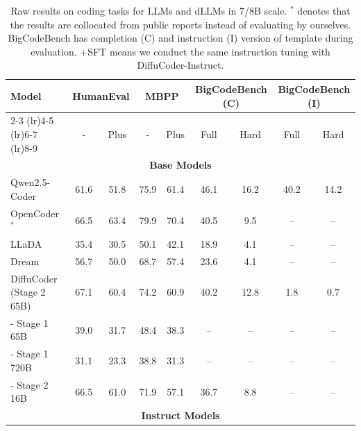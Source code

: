 \begin{table}[t]
    \centering
    \small
    \setlength{\tabcolsep}{8pt} 
    \caption{Raw results on coding tasks for LLMs and dLLMs in 7/8B scale. $^*$ denotes that the results are collocated from public reports instead of evaluating by ourselves. BigCodeBench has completion (C) and instruction (I) version of template during evaluation. +SFT means we conduct the same instruction tuning with DiffuCoder-Instruct.}
    \begin{tabular}{@{} l cc cc cc cc @{}}
        \toprule
        \multirow{2}{*}{\textbf{Model}}
            & \multicolumn{2}{c}{HumanEval}
            & \multicolumn{2}{c}{MBPP}
            & \multicolumn{2}{c}{BigCodeBench (C)} 
            & \multicolumn{2}{c}{BigCodeBench (I)} \\
        \cmidrule(lr){2-3} \cmidrule(lr){4-5} \cmidrule(lr){6-7} \cmidrule(lr){8-9}
            & -   & Plus
            & -   & Plus
            & \multicolumn{1}{c}{Full} & \multicolumn{1}{c}{Hard}
            & \multicolumn{1}{c}{Full} & \multicolumn{1}{c}{Hard}\\
        \midrule
        \multicolumn{9}{c}{\textbf{Base Models}} \\
        \midrule
        \cellcolor{lightRed!12}Qwen2.5-Coder      & 61.6  & 51.8  & 75.9  & 61.4  & 46.1  & 16.2  & 40.2 & 14.2 \\
        \cellcolor{lightRed!12}OpenCoder$^*$      & 66.5  & 63.4  & 79.9  & 70.4  & 40.5  & 9.5  & – & – \\
        \cellcolor{lightYellow!12}LLaDA         & 35.4  & 30.5  & 50.1  & 42.1   & 18.9  & 4.1  & – & – \\
        \cellcolor{lightYellow!12}Dream         & 56.7  & 50.0  & 68.7  & 57.4    & 23.6  & 4.1  & – & –\\
        \cellcolor{lightYellow!12}DiffuCoder (Stage 2 65B)            & 67.1  & 60.4  & 74.2  & 60.9  & 40.2  & 12.8  & 1.8 & 0.7 \\
        \quad \cellcolor{lightYellow!5}- Stage 1 65B            & 39.0	& 31.7&	48.4&	38.3  & –  & –  & –  & – \\
        \quad \cellcolor{lightYellow!5}- Stage 1 720B            & 31.1	&23.3&	38.8&	31.3  & –  & –  & –  & – \\
        \quad \cellcolor{lightYellow!5}- Stage 2 16B            & 66.5	& 61.0	&71.9	&57.1&	36.7	&8.8  & –  & – \\
        \midrule
        \multicolumn{9}{c}{\textbf{Instruct Models}} \\

\end{tabular}
\end{table}
